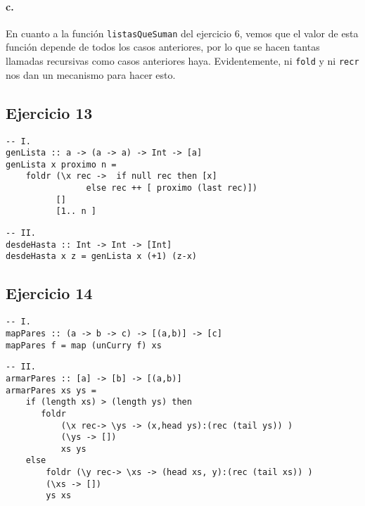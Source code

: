 \documentclass[10pt,a4paper]{article}
\begin{document}
\paragraph{c.} En cuanto a la función \texttt{listasQueSuman} del ejercicio 6, vemos que el valor de esta función depende de todos los casos anteriores, por lo que se hacen tantas llamadas recursivas como casos anteriores haya. Evidentemente, ni \texttt{fold} y ni \texttt{recr} nos dan un mecanismo para hacer esto.

\subsection{Ejercicio 13}
\begin{centrado}
	\begin{verbatim}
-- I.
genLista :: a -> (a -> a) -> Int -> [a]
genLista x proximo n = 
    foldr (\x rec ->  if null rec then [x]
	            else rec ++ [ proximo (last rec)])
          []
          [1.. n ]
	\end{verbatim}
\end{centrado}

\begin{centrado}
	\begin{verbatim}
-- II.
desdeHasta :: Int -> Int -> [Int]
desdeHasta x z = genLista x (+1) (z-x)
	\end{verbatim}
\end{centrado}

\subsection{Ejercicio 14}
\begin{centrado}
\begin{verbatim}
-- I.
mapPares :: (a -> b -> c) -> [(a,b)] -> [c]
mapPares f = map (unCurry f) xs
\end{verbatim}
\end{centrado}
\begin{centrado}
	\begin{verbatim}
-- II.
armarPares :: [a] -> [b] -> [(a,b)]
armarPares xs ys =
    if (length xs) > (length ys) then 
       foldr 
	       (\x rec-> \ys -> (x,head ys):(rec (tail ys)) )
           (\ys -> [])
           xs ys
    else 
		foldr (\y rec-> \xs -> (head xs, y):(rec (tail xs)) )
        (\xs -> [])
        ys xs
	\end{verbatim}
\end{centrado}
\end{document}
